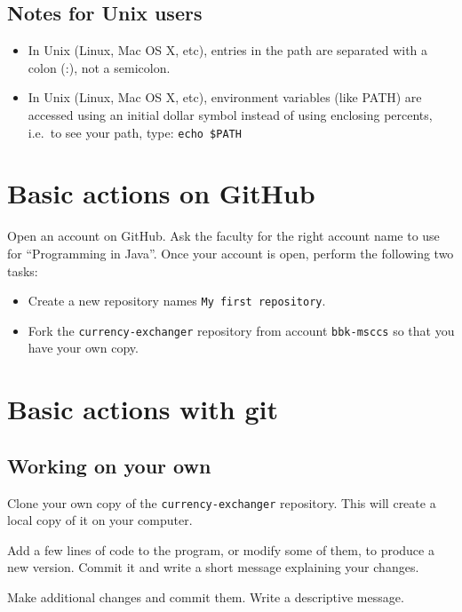 \documentclass{article}
\begin{document}
\subsection*{Notes for Unix users}
\label{sec:notes-unix-users}

\begin{itemize}
\item In Unix (Linux, Mac OS X, etc), entries in the path are
  separated with a colon (:), not a semicolon.
\item In Unix (Linux, Mac OS X, etc), environment variables (like
  PATH) are accessed using an initial dollar symbol instead of using
  enclosing percents, i.e.~to see your path, type: \verb+echo $PATH+
\end{itemize}

\section{Basic actions on GitHub}
\label{sec:basic-steps-with}

Open an account on GitHub. Ask the faculty for the right account name
to use for ``Programming in Java''. Once your account is open, perform
the following two tasks: 

\begin{itemize}
\item Create a new repository names \verb+My first repository+.
\item Fork the \verb+currency-exchanger+ repository from account
  \verb+bbk-msccs+ so that you have your own copy.
\end{itemize}

\section{Basic actions with git}
\label{sec:basic-actions-with}

\subsection{Working on your own}
\label{sec:working-your-own}

Clone your own copy of the \verb+currency-exchanger+ repository. This
will create a local copy of it on your computer. 

Add a few lines of code to the program, or modify some of them, to
produce a new version. Commit it and write a short message explaining
your changes. 

Make additional changes and commit them. Write a descriptive message. 
\end{document}
